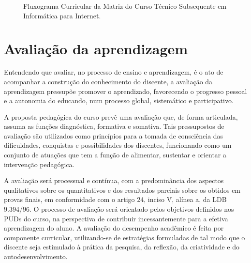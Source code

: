 \documentclass[
	12pt,				%
	openright,			%
	twoside,			%
	a4paper,			%
	chapter=TITLE,		%
	english,			%
	french,				%
	spanish,			%
	brazil,				%
	]{abntex2}
\begin{document}
\begin{figure}[htpb]
   \caption{Fluxograma Curricular da Matriz do Curso Técnico Subsequente em Informática para Internet.}
    \label{fig:fluxo}
\end{figure}

\color{black}

\chapter{Avaliação da aprendizagem}

Entendendo que avaliar, no processo de ensino e aprendizagem, é o ato de acompanhar a construção do conhecimento do discente, a avaliação da aprendizagem pressupõe promover o aprendizado, favorecendo o progresso pessoal e a autonomia do educando, num processo global, sistemático e participativo.

A proposta pedagógica do curso prevê uma avaliação que, de forma articulada, assuma as funções diagnóstica, formativa e somativa. Tais pressupostos de avaliação são utilizados como princípios para a tomada de consciência das dificuldades, conquistas e possibilidades dos discentes, funcionando como um conjunto de atuações que tem a função de alimentar, sustentar e orientar a intervenção pedagógica.

A avaliação será processual e contínua, com a predominância dos aspectos qualitativos sobre os quantitativos e dos resultados parciais sobre os obtidos em provas finais, em conformidade com o artigo 24, inciso V, alínea a, da LDB 9.394/96. O processo de avaliação será orientado pelos objetivos definidos nos PUDs do curso, na perspectiva de contribuir incessantemente para a efetiva aprendizagem do aluno. A avaliação do desempenho acadêmico é feita por componente curricular, utilizando-se de estratégias formuladas de tal modo que o discente seja estimulado à prática da pesquisa, da reflexão, da criatividade e do autodesenvolvimento.
\end{document}

